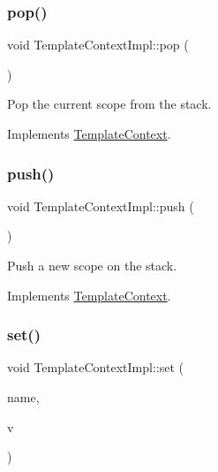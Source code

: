 \subsubsection{\texorpdfstring{pop()}{pop()}}
{\footnotesize\ttfamily void Template\+Context\+Impl\+::pop (\begin{DoxyParamCaption}{ }\end{DoxyParamCaption})\hspace{0.3cm}{\ttfamily [virtual]}}

Pop the current scope from the stack. 

Implements \mbox{\hyperlink{class_template_context_a853868792ccd7f9c5fed55338d23d019}{Template\+Context}}.

\mbox{\label{class_template_context_impl_a006f67f94724147908dda84dd8522d34}} 
\subsubsection{\texorpdfstring{push()}{push()}}
{\footnotesize\ttfamily void Template\+Context\+Impl\+::push (\begin{DoxyParamCaption}{ }\end{DoxyParamCaption})\hspace{0.3cm}{\ttfamily [virtual]}}

Push a new scope on the stack. 

Implements \mbox{\hyperlink{class_template_context_aac3a3e3c8e604db05e74cba7b1ce8554}{Template\+Context}}.

\mbox{\label{class_template_context_impl_a1ff06ac572e4d0456bca3feeac5f96f7}} 
\subsubsection{\texorpdfstring{set()}{set()}}
{\footnotesize\ttfamily void Template\+Context\+Impl\+::set (\begin{DoxyParamCaption}\item[{const char $\ast$}]{name,  }\item[{const \mbox{\hyperlink{class_template_variant}{Template\+Variant}} \&}]{v }\end{DoxyParamCaption})\hspace{0.3cm}{\ttfamily [virtual]}}

